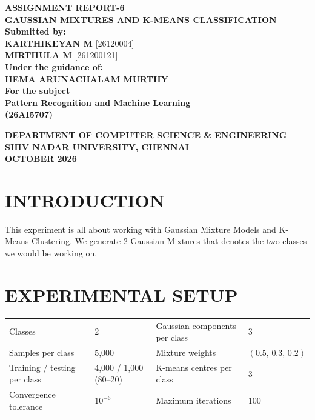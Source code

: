 \documentclass[11pt,a4paper]{article}
\begin{document}
\begin{titlepage}
\centering
\vspace*{2cm}
{\Large\textbf{ASSIGNMENT REPORT-6}}\\[0.7cm]
{\large\textbf{GAUSSIAN MIXTURES AND K-MEANS CLASSIFICATION}}\\[1.7cm]
\textbf{Submitted by:}\\[0.4cm]
\textbf{KARTHIKEYAN M} [26120004]\\[0.3cm]
\textbf{MIRTHULA M} [261200121]\\[1.8cm]
\textbf{Under the guidance of:}\\[0.4cm]
\textbf{HEMA ARUNACHALAM MURTHY}\\[1.5cm]
\textbf{For the subject}\\[0.4cm]
{\Large\textbf{Pattern Recognition and Machine Learning}}\\[0.3cm]
\textbf{(26AI5707)}
\vspace{2cm}

{\textbf{DEPARTMENT OF COMPUTER SCIENCE \& ENGINEERING}\\[0.3cm]
\textbf{SHIV NADAR UNIVERSITY, CHENNAI}\\[0.3cm]
\textbf{OCTOBER 2026}}
\end{titlepage}

\section*{INTRODUCTION}

This experiment is all about working with Gaussian Mixture Models and K-Means Clustering. We generate 2 Gaussian Mixtures that denotes the two classes we would be working on.

\section*{EXPERIMENTAL SETUP}
\begin{center}
\small
\begin{tabular}{llll}
\toprule
Classes & 2 & Gaussian components per class & 3 \\
Samples per class & 5,000 & Mixture weights & $(0.5,\,0.3,\,0.2)$ \\
Training / testing per class & 4,000 / 1,000 (80--20) & K-means centres per class & 3 \\
Convergence tolerance & $10^{-6}$ & Maximum iterations & 100 \\
\bottomrule
\end{tabular}
\end{center}
\end{document}
